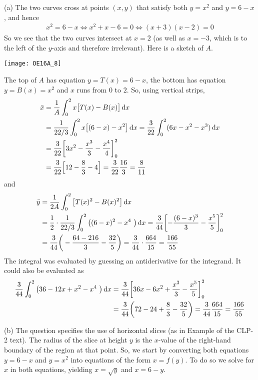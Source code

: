 \begin{solution} (a)
The two curves cross at points $(x,y)$ that satisfy both $y=x^2$ and $y = 6-x$,
and hence
\begin{align*}
x^2 = 6-x
\iff x^2+x-6=0
\iff (x+3)(x-2)=0
\end{align*}
So we see that the two curves intersect at $x=2$ (as well as $x=-3$,
which is to the left of the $y$-axis and therefore irrelevant).
Here is a sketch of $A$.
\begin{center}
   \texttt{[image: OE16A\_8]}
\end{center}
The top of $A$ has equation $y=T(x)=6-x$, the bottom has equation
$y=B(x)=x^2$ and $x$ runs from $0$ to $2$. So, using vertical strips,
\begin{align*}
\bar x &=\frac{1}{A} \int_0^2 x \big[T(x)-B(x)\big]\,\mathrm{d}x  \\
&=   \frac{1}{22/3}
  \int_0^2 x \big[ (6-x) - x^2 \big]\,\mathrm{d}x
       = \frac{3}{22}\int_0^2 (6x-x^2-x^3) \,\mathrm{d}x \\
  &= \frac{3}{22}
    \bigg[ 3x^2 - \frac{x^3}{3} - \frac{x^4}{4} \bigg]_0^2 \\
  &= \frac{3}{22}\Big[12 - \frac{8}{3} - 4\Big]
   = \frac{3}{22} \frac{16}{3}
   =\frac{8}{11}
\end{align*}
and
\begin{align*}
\bar y &=\frac{1}{2A} \int_0^2 \big[T(x)^2-B(x)^2\big]\,\mathrm{d}x  \\
 &= \frac{1}{2}\cdot\frac{1}{22/3}\int_0^2 \big( (6-x)^2 - x^4\ \big) \,\mathrm{d}x
 = \frac{3}{44} \bigg[ {-}\frac{(6-x)^3}{3} - \frac{x^5}{5} \bigg]_0^2 \\
  &=\frac{3}{44} \bigg(-\frac{64-216}{3} - \frac{32}{5} \bigg)
   = \frac{3}{44}\cdot\frac{664}{15}
   =\frac{166}{55}
\end{align*}
The integral was evaluated by guessing an antiderivative for the integrand.
It could also be evaluated as
\begin{align*}
  \frac{3}{44}\int_0^2 \big( 36-12x+x^2 - x^4\ \big) \,\mathrm{d}x
  &= \frac{3}{44} \bigg[36x-6x^2+\frac{x^3}3 - \frac{x^5}5\bigg]_0^2 \\
  &= \frac{3}{44} \bigg( 72-24+\frac83-\frac{32}5 \bigg)
   = \frac{3}{44}\frac{664}{15}
   = \frac{166}{55}
\end{align*}

\noindent (b)
The question specifies the use of horizontal slices (as in Example   of the CLP-2 text). The radius of the slice at height $y$ is the $x$-value of the right-hand boundary of the region at that point. So,
we start by converting both equations $y=6-x$ and $y=x^2$ into equations of
the form $x=f(y)$. To do so we solve for $x$ in both equations, yielding $x=\sqrt y$ and $x=6-y$.


\end{solution}

